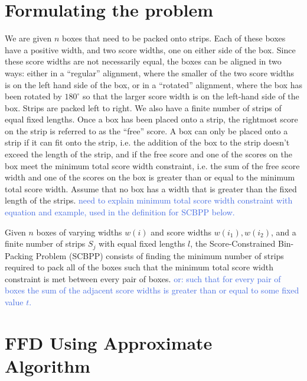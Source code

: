 \documentclass[oribibl]{llncs}
\begin{document}
\section{Formulating the problem}
We are given $n$ boxes that need to be packed onto strips. Each of these boxes have a positive width, and two score widths, one on either side of the box. Since these score widths are not necessarily equal, the boxes can be aligned in two ways: either in a ``regular'' alignment, where the smaller of the two score widths is on the left hand side of the box, or in a ``rotated'' alignment, where the box has been rotated by $180^{\circ}$ so that the larger score width is on the left-hand side of the box. Strips are packed left to right. We also have a finite number of strips of equal fixed lengths. Once a box has been placed onto a strip, the rightmost score on the strip is referred to as the ``free'' score. A box can only be placed onto a strip if it can fit onto the strip, i.e. the addition of the box to the strip doesn't exceed the length of the strip, and if the free score and one of the scores on the box meet the minimum total score width constraint, i.e. the sum of the free score width and one of the scores on the box is greater than or equal to the minimum total score width. Assume that no box has a width that is greater than the fixed length of the strips. \textcolor{RoyalBlue}{need to explain minimum total score width constraint with equation and example, used in the definition for SCBPP below.}


\begin{definition} 
	\label{defn:scbpp}
	Given $n$ boxes of varying widths $w(i)$ and score widths $w(i_1), w(i_2)$, and a finite number of strips $S_j$ with equal fixed lengths $l$, the Score-Constrained Bin-Packing Problem (SCBPP) consists of finding the minimum number of strips required to pack all of the boxes such that the minimum total score width constraint is met between every pair of boxes. \textcolor{RoyalBlue}{or: such that for every pair of boxes the sum of the adjacent score widths is greater than or equal to some fixed value $t$.}
\end{definition}



\section{FFD Using Approximate Algorithm}
\label{sec:ffdapprox}
\end{document}
